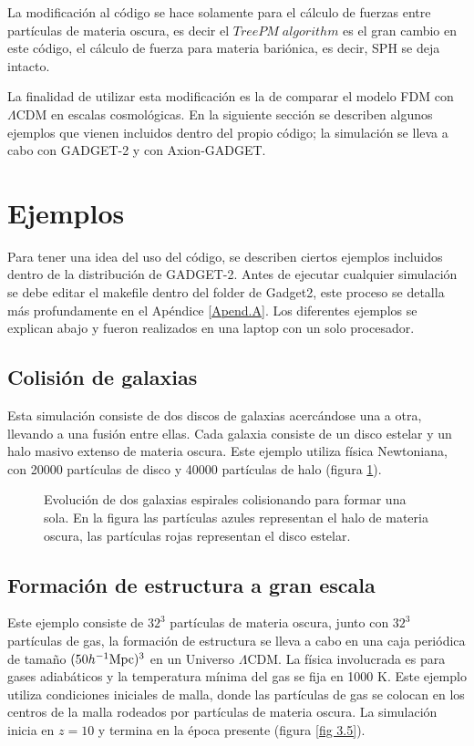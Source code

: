 \documentclass[a4paper,openright,12pt]{book}
\begin{document}
La modificación al código se hace solamente para el cálculo de fuerzas entre partículas de materia oscura, es decir el $TreePM\;algorithm$ es el gran cambio en este código, el cálculo de fuerza para materia bariónica, es decir, SPH se deja intacto.

La finalidad de utilizar esta modificación es la de comparar el modelo FDM con $\Lambda$CDM en escalas cosmológicas. En la siguiente sección se describen algunos ejemplos que vienen incluidos dentro del propio código; la simulación se lleva a cabo con GADGET-2 y con Axion-GADGET.

\section{Ejemplos}
Para tener una idea del uso del código, se describen ciertos ejemplos incluidos dentro de la distribución de GADGET-2. Antes de ejecutar cualquier simulación se debe editar el \textsf{makefile} dentro del folder de \textsf{Gadget2}, este proceso se detalla más profundamente en el Apéndice \ref{Apend.A}. Los diferentes ejemplos se explican abajo y fueron realizados en una laptop con un solo procesador.

\subsection{Colisión de galaxias}
Esta simulación consiste de dos discos de galaxias acercándose una a otra, llevando a una fusión entre ellas. Cada galaxia consiste de un disco estelar y un halo masivo extenso de materia oscura. Este ejemplo utiliza física Newtoniana, con 20000 partículas de disco y 40000 partículas de halo (figura \ref{fig 3.3}). 

\begin{figure}[htpb]
\centering
{}
\caption{\footnotesize{Evolución de dos galaxias espirales colisionando para formar una sola. En la figura las partículas azules representan el halo de materia oscura, las partículas rojas representan el disco estelar.}} \label{fig 3.3}
\end{figure}

\subsection{Formación de estructura a gran escala}
Este ejemplo consiste de $32^{3}$ partículas de materia oscura, junto con $32^{3}$ partículas de gas, la formación de estructura se lleva a cabo en una caja periódica de tamaño $(50 h^{-1} \textup{Mpc})^{3}$ en un Universo $\Lambda$CDM. La física involucrada es para gases adiabáticos y la temperatura mínima del gas se fija en 1000 K. Este ejemplo utiliza condiciones iniciales de malla, donde las partículas de gas se colocan en los centros de la malla rodeados por partículas de materia oscura. La simulación inicia en $z = 10$ y termina en la época presente (figura \ref{fig 3.5}).
\end{document}

